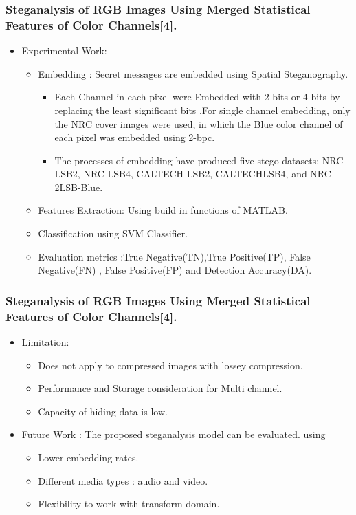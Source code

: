 \documentclass{beamer} %
\theoremstyle{definition} %
\begin{document}
\iffalse
\begin{frame}
\frametitle{Steganalysis of RGB Images Using Merged Statistical Features of Color Channels[4].}

\texttt{[image: nrcndcaltech.png]}
\texttt{[image: stegImage.png]}
\end{frame}

\fi

\begin{frame}
\frametitle{Steganalysis of RGB Images Using Merged Statistical Features of Color Channels[4].}
\begin{itemize}
\item Experimental Work:
 \begin{itemize}
 	 	\item Embedding : Secret messages are embedded using Spatial Steganography.
 	\begin{itemize}
 	\item Each Channel in each pixel were Embedded with 2 bits or 4 bits by replacing the least significant bits .For single channel embedding, only the NRC cover images were used, in which the Blue color channel of each pixel was embedded using 2-bpc.
 	\item  The processes of embedding have produced five stego datasets: NRC-LSB2, NRC-LSB4, CALTECH-LSB2, CALTECHLSB4, and NRC-2LSB-Blue.  
 \end{itemize}
      \item Features Extraction: Using build in functions of MATLAB. 
      \item Classification using SVM Classifier.
      \item Evaluation metrics :True Negative(TN),True Positive(TP), False Negative(FN) , False Positive(FP) and Detection Accuracy(DA).  
\end{itemize}
\end{itemize}
\end{frame}

\begin{frame}
\frametitle{Steganalysis of RGB Images Using Merged Statistical Features of Color Channels[4]. }
\begin{itemize}
\item Limitation: 
 \begin{itemize}
 	\item Does not apply to compressed images with lossey compression.
 	\item Performance and Storage consideration for Multi channel.
 	\item Capacity of hiding data is low.
 \end{itemize}
 \item Future Work : The proposed steganalysis model can be evaluated. using 
 \begin{itemize}
 	\item Lower embedding rates. 
 	\item Different media types : audio and video.  
 	\item Flexibility to work with transform domain.  
 \end{itemize}
 \end{itemize}
\end{frame}
\end{document}
